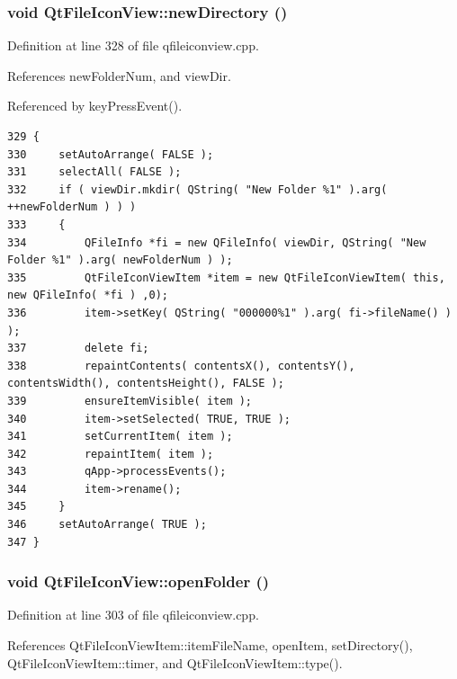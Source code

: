 \subsubsection{\setlength{\rightskip}{0pt plus 5cm}void Qt\-File\-Icon\-View::new\-Directory ()\hspace{0.3cm}{\tt  [slot]}}\label{classQtFileIconView_QtFileIconViewi2}




Definition at line 328 of file qfileiconview.cpp.

References new\-Folder\-Num, and view\-Dir.

Referenced by key\-Press\-Event().



\footnotesize\begin{verbatim}329 {
330     setAutoArrange( FALSE );
331     selectAll( FALSE );
332     if ( viewDir.mkdir( QString( "New Folder %1" ).arg( ++newFolderNum ) ) ) 
333     {                                                                        
334         QFileInfo *fi = new QFileInfo( viewDir, QString( "New Folder %1" ).arg( newFolderNum ) );
335         QtFileIconViewItem *item = new QtFileIconViewItem( this, new QFileInfo( *fi ) ,0);
336         item->setKey( QString( "000000%1" ).arg( fi->fileName() ) );
337         delete fi;
338         repaintContents( contentsX(), contentsY(), contentsWidth(), contentsHeight(), FALSE );
339         ensureItemVisible( item );
340         item->setSelected( TRUE, TRUE );
341         setCurrentItem( item );
342         repaintItem( item );
343         qApp->processEvents();
344         item->rename();
345     }
346     setAutoArrange( TRUE );
347 }
\end{verbatim}\normalsize 
{}
\subsubsection{\setlength{\rightskip}{0pt plus 5cm}void Qt\-File\-Icon\-View::open\-Folder ()\hspace{0.3cm}{\tt  [protected, slot]}}\label{classQtFileIconView_QtFileIconViewj15}




Definition at line 303 of file qfileiconview.cpp.

References Qt\-File\-Icon\-View\-Item::item\-File\-Name, open\-Item, set\-Directory(), Qt\-File\-Icon\-View\-Item::timer, and Qt\-File\-Icon\-View\-Item::type().



